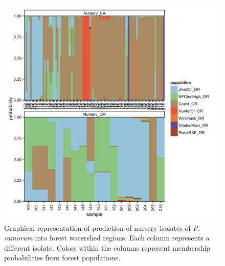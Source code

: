 \documentclass[double,12pt]{beavtex}
\begin{document}
  \begin{figure}
  
  {\centering \includegraphics[width=0.8\linewidth]{figure/phytopathology/figureS7} 
  
  }
  
  \caption[Graphical representation of prediction of nursery isolates of \emph{P.
  ramorum} into forest watershed regions.]{Graphical representation of prediction of nursery isolates of \emph{P.
  ramorum} into forest watershed regions. Each column represents a
  different isolate. Colors within the columns represent membership
  probabilities from forest populations.}\label{fig:ramS7}
  \end{figure}
  
\end{document}
